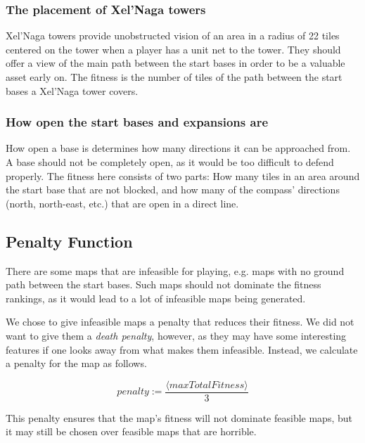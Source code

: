 	\subsubsection*{The placement of Xel'Naga towers}
	Xel'Naga towers provide unobstructed vision of an area in a radius of 22 tiles centered on the tower when a player has a unit net to the tower. They should offer a view of the main path between the start bases in order to be a valuable asset early on. The fitness is the number of tiles of the path between the start bases a Xel'Naga tower covers.

	\subsubsection*{How open the start bases and expansions are}
	How open a base is determines how many directions it can be approached from. A base should not be completely open, as it would be too difficult to defend properly. The fitness here consists of two parts: How many tiles in an area around the start base that are not blocked, and how many of the compass' directions (north, north-east, etc.) that are open in a direct line.

\subsection{Penalty Function}
\label{methodology_mapfitness_penalty}
There are some maps that are infeasible for playing, e.g. maps with no ground path between the start bases. Such maps should not dominate the fitness rankings, as it would lead to a lot of infeasible maps being generated. 

We chose to give infeasible maps a penalty that reduces their fitness. We did not want to give them a \textit{death penalty}\cite{coello2012constraint}, however, as they may have some interesting features if one looks away from what makes them infeasible. Instead, we calculate a penalty for the map as follows.

\begin{equation}
	penalty := \frac{\langle maxTotalFitness\rangle}{3}
\end{equation}

This penalty ensures that the map's fitness will not dominate feasible maps, but it may still be chosen over feasible maps that are horrible.